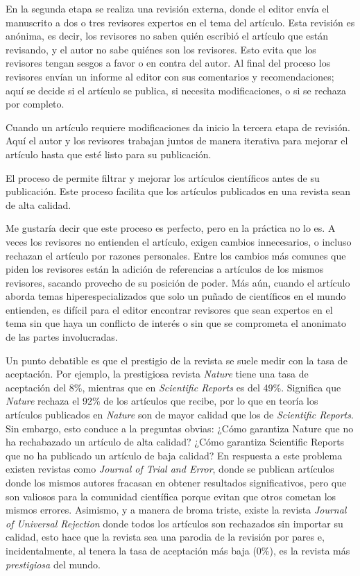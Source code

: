 En la segunda etapa se realiza una revisión externa, donde el editor envía el
manuscrito a dos o tres revisores expertos en el tema del artículo.
Esta revisión es anónima, es decir, los revisores no saben quién escribió el
artículo que están revisando, y el autor no sabe quiénes son los revisores.
Esto evita que los revisores tengan sesgos a favor o en contra del autor.
Al final del proceso los revisores envían un informe al editor con sus
comentarios y recomendaciones; aquí se decide si el artículo se publica, si
necesita modificaciones, o si se rechaza por completo.

Cuando un artículo requiere modificaciones da inicio la tercera etapa de
revisión.
Aquí el autor y los revisores trabajan juntos de manera iterativa para mejorar
el artículo hasta que esté listo para su publicación.

\begin{remember}
    El proceso de  permite filtrar y mejorar los
    artículos científicos antes de su publicación.
    Este proceso facilita que los artículos publicados en una revista sean de
    alta calidad.
\end{remember}

Me gustaría decir que este proceso es perfecto, pero en la práctica no lo es.
A veces los revisores no entienden el artículo, exigen cambios innecesarios, o
incluso rechazan el artículo por razones personales.
Entre los cambios más comunes que piden los revisores están la adición de
referencias a artículos de los mismos revisores, sacando provecho de su posición
de poder.
Más aún, cuando el artículo aborda temas hiperespecializados que solo un puñado
de científicos en el mundo entienden, es difícil para el editor encontrar
revisores que sean expertos en el tema sin que haya un conflicto de interés o
sin que se comprometa el anonimato de las partes involucradas.

Un punto debatible es que el prestigio de la revista se suele medir con la tasa
de aceptación.
Por ejemplo, la prestigiosa revista \emph{Nature} tiene una tasa de aceptación
del 8\%, mientras que en \emph{Scientific Reports} es del 49\%.
Significa que \emph{Nature} rechaza el 92\% de los artículos que recibe, por lo
que en teoría los artículos publicados en \emph{Nature} son de mayor calidad que
los de \emph{Scientific Reports}.
Sin embargo, esto conduce a la preguntas obvias:
¿Cómo garantiza Nature que no ha rechabazado un artículo de alta calidad?
¿Cómo garantiza Scientific Reports que no ha publicado un artículo de baja
calidad?
En respuesta a este problema existen revistas como \emph{Journal of Trial and
    Error}, donde se publican
artículos donde los mismos autores fracasan en obtener resultados
significativos, pero que son valiosos para la comunidad científica porque evitan
que otros cometan los mismos errores.
Asimismo, y a manera de broma triste, existe la revista \emph{Journal of
    Universal Rejection} donde todos
los artículos son rechazados sin importar su calidad, esto hace que la revista
sea una parodia de la revisión por pares e, incidentalmente, al tenera la tasa
de aceptación más baja (0\%), es la revista más \emph{prestigiosa} del mundo.

